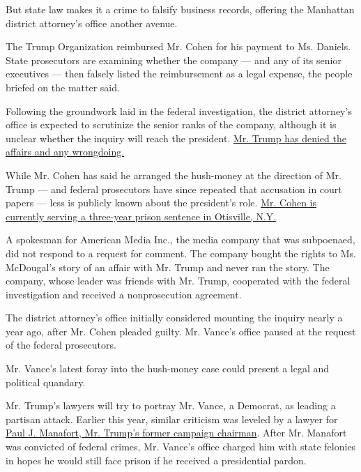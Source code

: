 But state law makes it a crime to falsify business records, offering the
Manhattan district attorney's office another avenue.

The Trump Organization reimbursed Mr. Cohen for his payment to Ms.
Daniels. State prosecutors are examining whether the company --- and any
of its senior executives --- then falsely listed the reimbursement as a
legal expense, the people briefed on the matter said.

Following the groundwork laid in the federal investigation, the district
attorney's office is expected to scrutinize the senior ranks of the
company, although it is unclear whether the inquiry will reach the
president.
\href{https://www.nytimes.com/2018/05/04/us/politics/trump-hush-payment-stormy-daniels.html?module=inline}{Mr.
Trump has denied the affairs and any wrongdoing.}

While Mr. Cohen has said he arranged the hush-money at the direction of
Mr. Trump --- and federal prosecutors have since repeated that
accusation in court papers --- less is publicly known about the
president's role.
\href{https://www.nytimes.com/2018/12/12/nyregion/michael-cohen-sentence-trump.html?module=inline}{Mr.
Cohen is currently serving a three-year prison sentence in Otisville,
N.Y.}

A spokesman for American Media Inc., the media company that was
subpoenaed, did not respond to a request for comment. The company bought
the rights to Ms. McDougal's story of an affair with Mr. Trump and never
ran the story. The company, whose leader was friends with Mr. Trump,
cooperated with the federal investigation and received a nonprosecution
agreement.

The district attorney's office initially considered mounting the inquiry
nearly a year ago, after Mr. Cohen pleaded guilty. Mr. Vance's office
paused at the request of the federal prosecutors.

Mr. Vance's latest foray into the hush-money case could present a legal
and political quandary.

Mr. Trump's lawyers will try to portray Mr. Vance, a Democrat, as
leading a partisan attack. Earlier this year, similar criticism was
leveled by a lawyer for
\href{https://www.nytimes.com/2019/03/13/us/politics/paul-manafort-sentencing.html}{Paul
J. Manafort, Mr. Trump's former campaign chairman}. After Mr. Manafort
was convicted of federal crimes, Mr. Vance's office charged him with
state felonies in hopes he would still face prison if he received a
presidential pardon.

